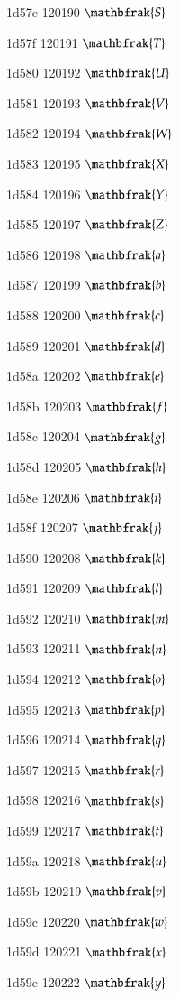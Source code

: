 \documentclass[11pt]{article}
\begin{document}
1d57e 120190 \ensuremath{\mathbfrak{S}}

1d57f 120191 \ensuremath{\mathbfrak{T}}

1d580 120192 \ensuremath{\mathbfrak{U}}

1d581 120193 \ensuremath{\mathbfrak{V}}

1d582 120194 \ensuremath{\mathbfrak{W}}

1d583 120195 \ensuremath{\mathbfrak{X}}

1d584 120196 \ensuremath{\mathbfrak{Y}}

1d585 120197 \ensuremath{\mathbfrak{Z}}

1d586 120198 \ensuremath{\mathbfrak{a}}

1d587 120199 \ensuremath{\mathbfrak{b}}

1d588 120200 \ensuremath{\mathbfrak{c}}

1d589 120201 \ensuremath{\mathbfrak{d}}

1d58a 120202 \ensuremath{\mathbfrak{e}}

1d58b 120203 \ensuremath{\mathbfrak{f}}

1d58c 120204 \ensuremath{\mathbfrak{g}}

1d58d 120205 \ensuremath{\mathbfrak{h}}

1d58e 120206 \ensuremath{\mathbfrak{i}}

1d58f 120207 \ensuremath{\mathbfrak{j}}

1d590 120208 \ensuremath{\mathbfrak{k}}

1d591 120209 \ensuremath{\mathbfrak{l}}

1d592 120210 \ensuremath{\mathbfrak{m}}

1d593 120211 \ensuremath{\mathbfrak{n}}

1d594 120212 \ensuremath{\mathbfrak{o}}

1d595 120213 \ensuremath{\mathbfrak{p}}

1d596 120214 \ensuremath{\mathbfrak{q}}

1d597 120215 \ensuremath{\mathbfrak{r}}

1d598 120216 \ensuremath{\mathbfrak{s}}

1d599 120217 \ensuremath{\mathbfrak{t}}

1d59a 120218 \ensuremath{\mathbfrak{u}}

1d59b 120219 \ensuremath{\mathbfrak{v}}

1d59c 120220 \ensuremath{\mathbfrak{w}}

1d59d 120221 \ensuremath{\mathbfrak{x}}

1d59e 120222 \ensuremath{\mathbfrak{y}}
\end{document}
